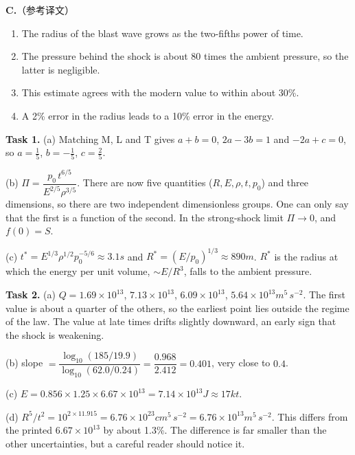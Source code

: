 \documentclass[11pt,a4paper]{article}
\begin{document}
\textbf{C.}（参考译文）
\begin{enumerate}[label=\textbf{\arabic*.}]
  \item The radius of the blast wave grows as the two-fifths power of time.
  \item The pressure behind the shock is about 80 times the ambient pressure, so the latter is negligible.
  \item This estimate agrees with the modern value to within about 30\%.
  \item A 2\% error in the radius leads to a 10\% error in the energy.
\end{enumerate}

\textbf{Task 1.}
(a) Matching M, L and T gives $a+b=0$, $2a-3b=1$ and $-2a+c=0$, so $a=\frac15$, $b=-\frac15$, $c=\frac25$.

(b) $\Pi=\dfrac{p_0\,t^{6/5}}{E^{2/5}\rho^{3/5}}$. There are now five quantities ($R,E,\rho,t,p_0$) and three dimensions, so there are two independent dimensionless groups. One can only say that the first is a function of the second. In the strong-shock limit $\Pi\to0$, and $f(0)=S$.

(c) $t^*=E^{1/3}\rho^{1/2}p_0^{-5/6}\approx3.1\unit{s}$ and $R^*=(E/p_0)^{1/3}\approx890\unit{m}$. $R^*$ is the radius at which the energy per unit volume, $\sim E/R^3$, falls to the ambient pressure.\\

\textbf{Task 2.}
(a) $Q=1.69\times10^{13}$, $7.13\times10^{13}$, $6.09\times10^{13}$, $5.64\times10^{13}\unit{m^5\,s^{-2}}$. The first value is about a quarter of the others, so the earliest point lies outside the regime of the law. The value at late times drifts slightly downward, an early sign that the shock is weakening.

(b) slope $=\dfrac{\log_{10}(185/19.9)}{\log_{10}(62.0/0.24)}=\dfrac{0.968}{2.412}=0.401$, very close to $0.4$.

(c) $E=0.856\times1.25\times6.67\times10^{13}=7.14\times10^{13}\unit{J}\approx17\unit{kt}$.\\

(d) $R^5/t^2=10^{2\times11.915}=6.76\times10^{23}\unit{cm^5\,s^{-2}}=6.76\times10^{13}\unit{m^5\,s^{-2}}$. This differs from the printed $6.67\times10^{13}$ by about 1.3\%. The difference is far smaller than the other uncertainties, but a careful reader should notice it.\\
\end{document}
